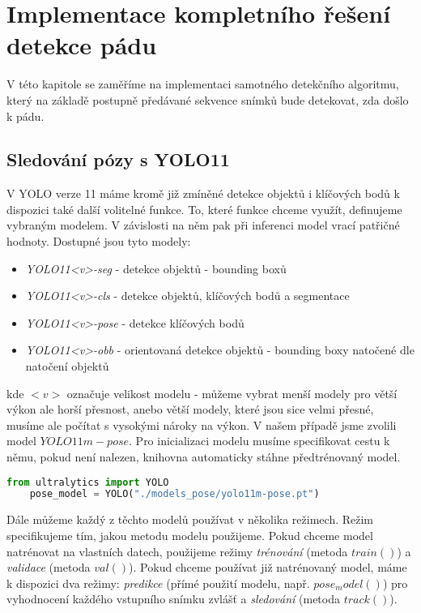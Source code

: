 \chapter{Implementace kompletního řešení detekce pádu}
\label{chap:detectionAlgorithm}

V této kapitole se zaměříme na implementaci samotného detekčního algoritmu,
který na základě postupně předávané sekvence snímků bude detekovat, zda došlo k
pádu.

\section{Sledování pózy s YOLO11}

V YOLO verze 11 máme kromě již zmíněné detekce objektů i klíčových bodů k
dispozici také další volitelné funkce. To, které funkce chceme využít,
definujeme vybraným modelem. V závislosti na něm pak při inferenci model
vrací patřičné hodnoty. Dostupné jsou tyto modely:
\begin{itemize}
    \item \textit{YOLO11<v>-seg }- detekce objektů - bounding boxů
    \item \textit{YOLO11<v>-cls }- detekce objektů, klíčových bodů a segmentace
    \item \textit{YOLO11<v>-pose} - detekce klíčových bodů
    \item \textit{YOLO11<v>-obb }- orientovaná detekce objektů - bounding boxy natočené dle natočení objektů
\end{itemize}

kde $<v>$ označuje velikost modelu - můžeme vybrat menší modely pro větší výkon
ale horší přesnost, anebo větší modely, které jsou sice velmi přesné, musíme
ale počítat s vysokými nároky na výkon. V našem případě jsme zvolili model
$YOLO11m-pose$. Pro inicializaci modelu musíme specifikovat cestu k němu, pokud
není nalezen, knihovna automaticky stáhne předtrénovaný model.

\begin{lstlisting}[language=Python, label=src:params, caption={Inicializace modelu $YOLO11m-pose$}]    
    from ultralytics import YOLO    
    pose_model = YOLO("./models_pose/yolo11m-pose.pt")
\end{lstlisting}

Dále můžeme každý z těchto modelů používat v několika režimech. Režim
specifikujeme tím, jakou metodu modelu použijeme. Pokud chceme model natrénovat
na vlastních datech, použijeme režimy \textit{trénování} (metoda $train()$) a
\textit{validace} (metoda $val()$). Pokud chceme používat již natrénovaný
model, máme k dispozici dva režimy: \textit{predikce} (přímé použití modelu,
např. $pose_model()$) pro vyhodnocení každého vstupního snímku zvlášť a
\textit{sledování} (metoda $track()$).

